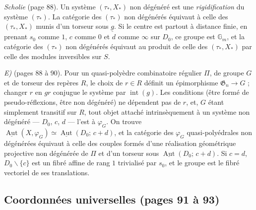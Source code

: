\documentclass[11pt,a4paper]{article}
\begin{document}
\emph{Scholie} (page 88). Un système $(\tau_*, X_*)$ non dégénéré est une
\emph{rigidification} du système $(\tau_*)$. La catégorie des $(\tau_*)$ non
dégénérés équivaut à celle des $(\tau_*, X_*)$ munis d'un torseur sous
$\underline{g}$. Si le centre est partout à distance finie, en prenant $s_0$
comme $1$, $c$ comme $0$ et $d$ comme $\infty$ sur $D_0$, ce groupe est
$\mathbb{G}_m$, et la catégorie des $(\tau_*)$ non dégénérés équivaut au produit
de celle des $(\tau_*, X_*)$ par celle des modules inversibles sur $S$.

\emph{E)} (pages 88 à 90). Pour un quasi-polyèdre combinatoire régulier $\Pi$,
de groupe $G$ et de torseur des repères $R$, le choix de $r \in R$ définit un
épimorphisme $\mathfrak{G}_n \to G$ ; changer $r$ en $gr$ conjugue le système par
$\operatorname{int}(g)$. Les conditions (être formé de pseudo-réflexions, être
non dégénéré) ne dépendent pas de $r$, et, $G$ étant simplement transitif sur
$R$, tout objet attaché intrinsèquement à un système non dégénéré --- $D_0$, $c$,
$d$ --- l'est à $\varphi_G$. On trouve $\underline{\operatorname{Aut}}(X,
\varphi_G) \simeq \underline{\operatorname{Aut}}(D_0;\, c + d)$, et la catégorie
des $\varphi_G$ quasi-polyédrales non dégénérées équivaut à celle des couples
formés d'une réalisation géométrique projective non dégénérée de $\Pi$ et d'un
torseur sous $\underline{\operatorname{Aut}}(D_0;\, c + d)$. Si $c = d$,
$D_0 \smallsetminus \{c\}$ est un fibré affine de rang $1$ trivialisé par $s_0$,
et le groupe est le fibré vectoriel de ses translations.

\subsection*{Coordonnées universelles (pages 91 à 93)}
\end{document}
